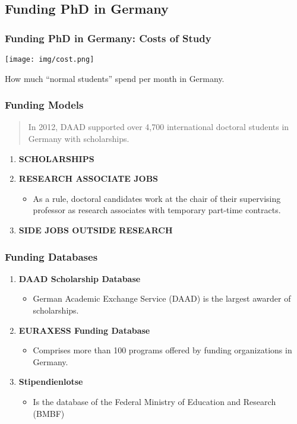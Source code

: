 \documentclass[9pt, compress]{beamer}
\begin{document}
    \subsection{Funding PhD in Germany}
    \begin{frame} 
        \frametitle{Funding PhD in Germany: Costs of Study}
        \texttt{[image: img/cost.png]}
        \begin{center}
            How much “normal students” spend per month in Germany.
        \end{center}
    \end{frame}
    \begin{frame} 
        \frametitle{Funding Models}
    \begin{quotation}
        In 2012, DAAD supported over 4,700 international doctoral students in Germany with scholarships.
    \end{quotation}
        \begin{enumerate}
            \setcounter{enumi}{0}
            \item \textbf{SCHOLARSHIPS}
            \item \textbf{RESEARCH ASSOCIATE JOBS}
            \begin{itemize}
                \item As a rule, doctoral candidates work at the chair of their supervising professor as research associates with temporary part-time contracts.
            \end{itemize}
            \item  \textbf{SIDE JOBS OUTSIDE RESEARCH}
        \end{enumerate} 
    \end{frame}
    \begin{frame} 
        \frametitle{Funding Databases}
        \begin{enumerate}
            \setcounter{enumi}{0}
            \item \textbf{DAAD Scholarship Database}
            \begin{itemize}
                \item German Academic Exchange Service (DAAD) is the largest awarder of scholarships. 
            \end{itemize}
            \item \textbf{EURAXESS Funding Database}
            \begin{itemize}
                \item  Comprises more than 100 programs offered by funding organizations in Germany.
            \end{itemize}
            \item  \textbf{Stipendienlotse}
            \begin{itemize}
                \item Is the database of the Federal Ministry of Education and Research (BMBF) 
            \end{itemize}
        \end{enumerate} 
    \end{frame}
\end{document}
